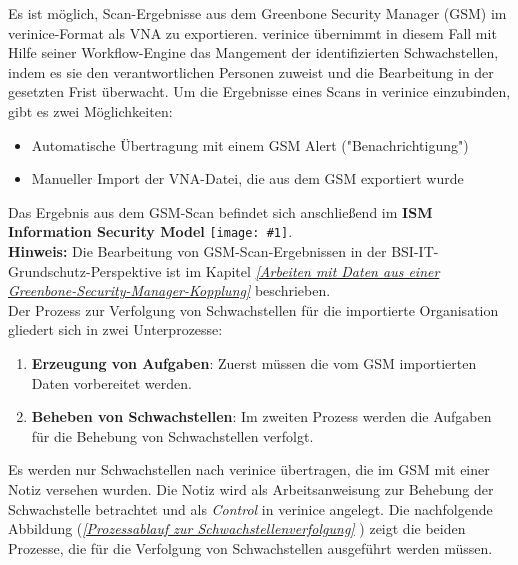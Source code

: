 \documentclass[a4paper,10pt]{book}
\newcommand{\icon}[1]{\texttt{[image: \#1]}}
\begin{document}
Es ist möglich, Scan-Ergebnisse aus dem Greenbone Security Manager (GSM) im
verinice-Format als VNA zu exportieren. verinice übernimmt in diesem Fall mit
Hilfe seiner Workflow-Engine das Mangement der identifizierten Schwachstellen,
indem es sie den verantwortlichen Personen zuweist und die Bearbeitung in der
gesetzten Frist überwacht. Um die Ergebnisse eines Scans in verinice
einzubinden, gibt es zwei Möglichkeiten:
 \begin{itemize}
 \item Automatische Übertragung mit einem GSM Alert ("Benachrichtigung")
 \item Manueller Import der VNA-Datei, die aus dem GSM exportiert wurde
\end{itemize}
Das Ergebnis aus dem GSM-Scan befindet sich anschließend im \textbf{ISM Information Security Model} \icon{Icon/Informationssicherheitsmodell.png}.
\newline\\
\textbf{Hinweis:} Die Bearbeitung von GSM-Scan-Ergebnissen in der BSI-IT-Grundschutz-Perspektive ist im Kapitel {\em \ref{Arbeiten mit Daten aus einer Greenbone-Security-Manager-Kopplung} } beschrieben.
\newline\\
Der Prozess zur Verfolgung von Schwachstellen für die importierte Organisation gliedert sich in zwei Unterprozesse:
\begin{enumerate}
 \item \textbf{Erzeugung von Aufgaben}: Zuerst müssen die vom GSM importierten
 Daten vorbereitet werden.
 \item \textbf{Beheben von Schwachstellen}: Im zweiten Prozess werden die
 Aufgaben für die Behebung von Schwachstellen verfolgt.
\end{enumerate}
Es werden nur Schwachstellen nach verinice übertragen, die im GSM mit einer Notiz versehen wurden. Die Notiz wird als Arbeitsanweisung zur Behebung der Schwachstelle betrachtet und als {\em Control} in verinice angelegt.
Die nachfolgende Abbildung ({\em \ref{Prozessablauf zur Schwachstellenverfolgung} }) zeigt die beiden Prozesse, die für die Verfolgung von Schwachstellen ausgeführt werden müssen.
\end{document}
